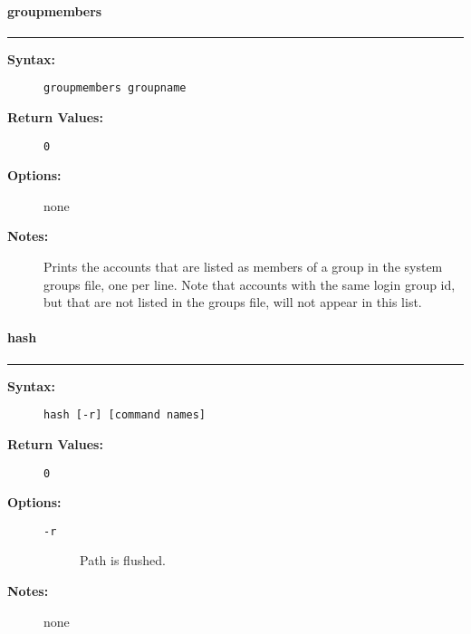 \vspace {2pt}


\paragraph{groupmembers}

\hrule
\begin{description}
\item[{\bf Syntax:}] \mbox{}

{\tt groupmembers groupname}

\item[{\bf Return Values:}] \mbox{}

\begin{description}
\item[{\tt 0}] \mbox{}



\end{description}


\item[{\bf Options:}] \mbox{}

none  

\item[{\bf Notes:}] \mbox{}

Prints the accounts that are listed as 
members of a group in the system groups file, one per line.
Note that accounts with the same login group id, but that are 
not listed in the groups file, will not appear in this list.

\end{description}


\vspace {2pt}


\paragraph{hash}

\hrule
\begin{description}
\item[{\bf Syntax:}] \mbox{}

{\tt hash [-r] [command names]}

\item[{\bf Return Values:}] \mbox{}

\begin{description}
\item[{\tt 0}] \mbox{}



\end{description}


\item[{\bf Options:}] \mbox{}

\begin{description}
\item[{\tt -r}] \mbox{}

Path is flushed.

\end{description}


\item[{\bf Notes:}] \mbox{}

none  

\end{description}


